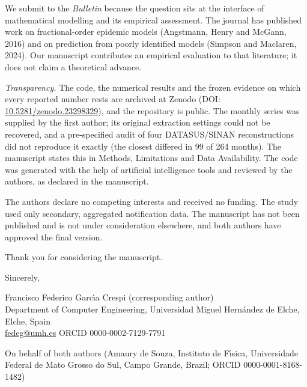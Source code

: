 \documentclass[11pt,a4paper]{article}
\begin{document}
We submit to the \emph{Bulletin} because the question sits at the interface of mathematical modelling and its empirical assessment. The journal has published work on fractional-order epidemic models (Angstmann, Henry and McGann, 2016) and on prediction from poorly identified models (Simpson and Maclaren, 2024). Our manuscript contributes an empirical evaluation to that literature; it does not claim a theoretical advance.

\emph{Transparency.} The code, the numerical results and the frozen evidence on which every reported number rests are archived at Zenodo (DOI: \href{https://doi.org/10.5281/zenodo.23298329}{10.5281/zenodo.23298329}), and the repository is public. The monthly series was supplied by the first author; its original extraction settings could not be recovered, and a pre-specified audit of four DATASUS/SINAN reconstructions did not reproduce it exactly (the closest differed in 99 of 264 months). The manuscript states this in Methods, Limitations and Data Availability. The code was generated with the help of artificial intelligence tools and reviewed by the authors, as declared in the manuscript.

The authors declare no competing interests and received no funding. The study used only secondary, aggregated notification data. The manuscript has not been published and is not under consideration elsewhere, and both authors have approved the final version.

Thank you for considering the manuscript.

Sincerely,

\bigskip

Francisco Federico Garc\'{\i}a Crespi (corresponding author)\\
Department of Computer Engineering, Universidad Miguel Hern\'andez de Elche, Elche, Spain\\
\href{mailto:fedeg@umh.es}{fedeg@umh.es} \textperiodcentered{} ORCID 0000-0002-7129-7791

On behalf of both authors (Amaury de Souza, Instituto de F\'{\i}sica, Universidade Federal de Mato Grosso do Sul, Campo Grande, Brazil; ORCID 0000-0001-8168-1482)
\end{document}
